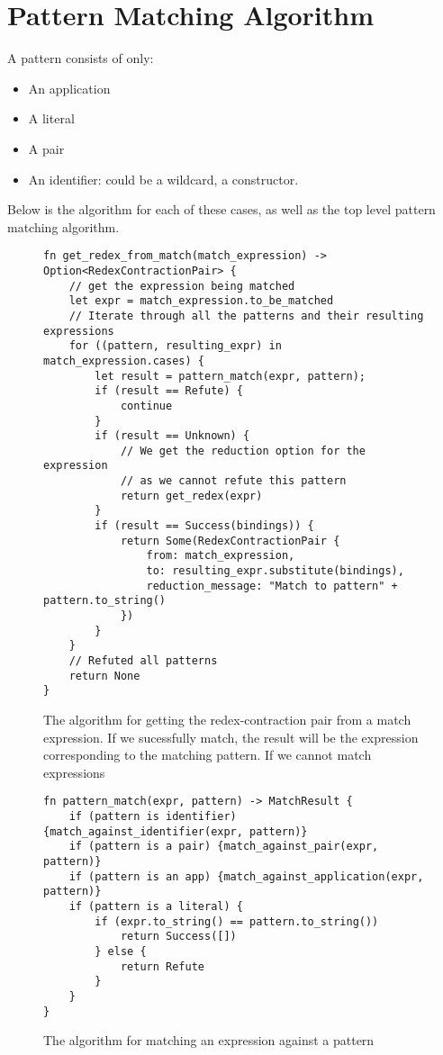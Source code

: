\chapter{Pattern Matching Algorithm}
A pattern consists of only:
\begin{itemize}
    \item An application
    \item A literal
    \item A pair
    \item An identifier: could be a wildcard, a constructor.
\end{itemize}

Below is the algorithm for each of these cases, as well as the top level pattern matching algorithm. 

\begin{figure}[h]
    \begin{lstlisting}[language=Rust_boxed]
fn get_redex_from_match(match_expression) -> Option<RedexContractionPair> {
    // get the expression being matched
    let expr = match_expression.to_be_matched
    // Iterate through all the patterns and their resulting expressions
    for ((pattern, resulting_expr) in match_expression.cases) {
        let result = pattern_match(expr, pattern);
        if (result == Refute) {
            continue
        }
        if (result == Unknown) {
            // We get the reduction option for the expression
            // as we cannot refute this pattern
            return get_redex(expr)
        }
        if (result == Success(bindings)) {
            return Some(RedexContractionPair {
                from: match_expression,
                to: resulting_expr.substitute(bindings),
                reduction_message: "Match to pattern" + pattern.to_string()
            })
        }
    }
    // Refuted all patterns
    return None
}
\end{lstlisting}
    \caption{The algorithm for getting the redex-contraction pair from a match expression. If we sucessfully match, the result will be the expression corresponding to the matching pattern. If we cannot match expressions}
    \label{fig:all_pattern_list_iterate}
\end{figure}

\begin{figure}[h]
    \begin{lstlisting}[language=Rust_boxed]
fn pattern_match(expr, pattern) -> MatchResult {
    if (pattern is identifier) {match_against_identifier(expr, pattern)}
    if (pattern is a pair) {match_against_pair(expr, pattern)}
    if (pattern is an app) {match_against_application(expr, pattern)}
    if (pattern is a literal) {
        if (expr.to_string() == pattern.to_string()) 
            return Success([])
        } else {
            return Refute
        }
    }
}
\end{lstlisting}
    \caption{The algorithm for matching an expression against a pattern}
    \label{fig:pattern_list_top_level}
\end{figure}

